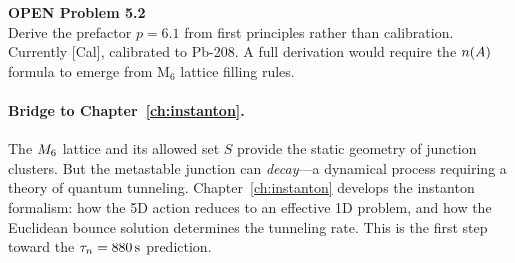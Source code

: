 \begin{edcopenbox}
\textbf{OPEN Problem 5.2} \tagOPEN \\
Derive the prefactor $p = 6.1$ from first principles rather than calibration.
Currently [Cal], calibrated to Pb-208. A full derivation would require the
$n(A)$ formula to emerge from M$_6$ lattice filling rules.
\end{edcopenbox}

\paragraph{Bridge to Chapter~\ref{ch:instanton}.}
The $M_6$ lattice and its allowed set $S$ provide the static geometry of
junction clusters. But the metastable junction can \emph{decay}---a dynamical
process requiring a theory of quantum tunneling. Chapter~\ref{ch:instanton}
develops the instanton formalism: how the 5D action reduces to an effective
1D problem, and how the Euclidean bounce solution determines the tunneling rate.
This is the first step toward the $\tau_n = 880\,\mathrm{s}$ prediction.

